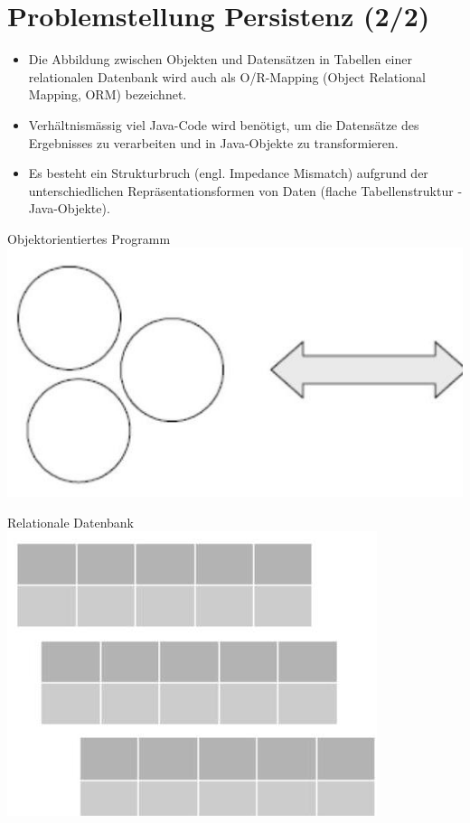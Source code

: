 \section*{Problemstellung Persistenz (2/2)}
\begin{itemize}
  \item Die Abbildung zwischen Objekten und Datensätzen in Tabellen einer relationalen Datenbank wird auch als O/R-Mapping (Object Relational Mapping, ORM) bezeichnet.
  \item Verhältnismässig viel Java-Code wird benötigt, um die Datensätze des Ergebnisses zu verarbeiten und in Java-Objekte zu transformieren.
  \item Es besteht ein Strukturbruch (engl. Impedance Mismatch) aufgrund der unterschiedlichen Repräsentationsformen von Daten (flache Tabellenstruktur -Java-Objekte).
\end{itemize}

Objektorientiertes Programm\\
\includegraphics[width=\linewidth]{images/2025_01_02_5ba1dc702e9f94ba8e06g-06}

Relationale Datenbank\\
\includegraphics[width=\linewidth]{images/2025_01_02_5ba1dc702e9f94ba8e06g-06(1)}

